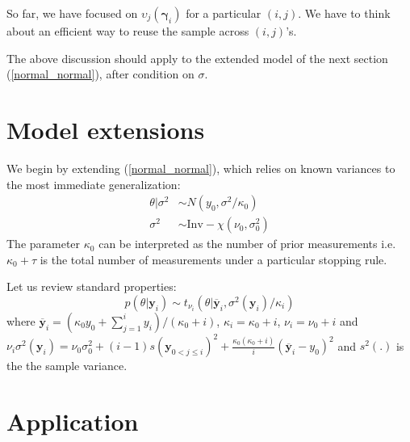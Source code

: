 \documentclass[11pt]{article}
\begin{document}
So far, we have focused on $\upsilon_j(\boldsymbol{\gamma}_i)$ for a
particular $(i,j)$. We have to think about an efficient way to reuse
the sample across $(i,j)$'s.

The above discussion should apply to the extended model of the next
section (\ref{normal_normal}), after condition on $\sigma$.

\section{Model extensions}
We begin by extending (\ref{normal_normal}), which relies on known
variances to the most immediate generalization:
\begin{align}\label{N_xi}
\theta|\sigma^2 &\sim N(y_0,\sigma^2/\kappa_0)\\
\sigma^2 &\sim \mathrm{Inv}-\chi(\nu_0,\sigma_0^2)
\end{align}The parameter $\kappa_0$ can be interpreted as the number of
prior measurements i.e. $\kappa_0+\tau$ is the total number of
measurements under a particular stopping rule.

Let us review standard properties:
\begin{equation}
p(\theta|\mathbf{y}_i)\sim
t_{\nu_i}(\theta|\overline{\mathbf{y}}_i,\sigma^2(\mathbf{y}_i)/\kappa_i)
\end{equation}where $\overline{\mathbf{y}}_i=(\kappa_0 y_0 +\sum_{j=1}^i
y_i)/(\kappa_0+i)$, $\kappa_i=\kappa_0+i$, $\nu_i=\nu_0+i$ and
$\nu_i\sigma^2(\mathbf{y}_i)=\nu_0\sigma_0^2+(i-1)s(\mathbf{y}_{0<j\leq
i})^2+\frac{\kappa_0(\kappa_0+i)}{i}(\overline{\mathbf{y}}_{i}-y_0)^2$
and $s^2(.)$ is the the sample variance.

\section{Application}
\end{document}
